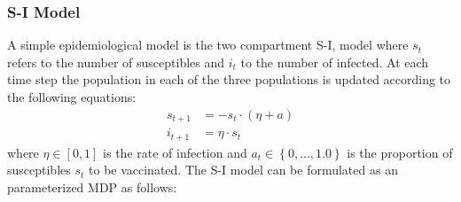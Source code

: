 \subsubsection{S-I Model}
\label{sec:results_influenza_sd}

A simple epidemiological model is the two compartment S-I, model where {\footnotesize $ s_t $} refers to the number of susceptibles and {\footnotesize $ i_t $} to the number of infected. At each time step the population in each of the three populations is updated according to the following equations:
{\footnotesize
\begin{align*}
    s_{t + 1} &= - s_t \cdot ( \eta + a ) \\
    i_{t+1} &= \eta \cdot s_t 
\end{align*}
}
where {\footnotesize $ \eta \in [0, 1]$} is the rate of infection and {\footnotesize $ a_t \in \left\lbrace 0, \ldots, 1.0\right\rbrace $} is the proportion of susceptibles {\footnotesize $ s_t $} to be vaccinated. The S-I model can be formulated as an parameterized MDP as follows:
